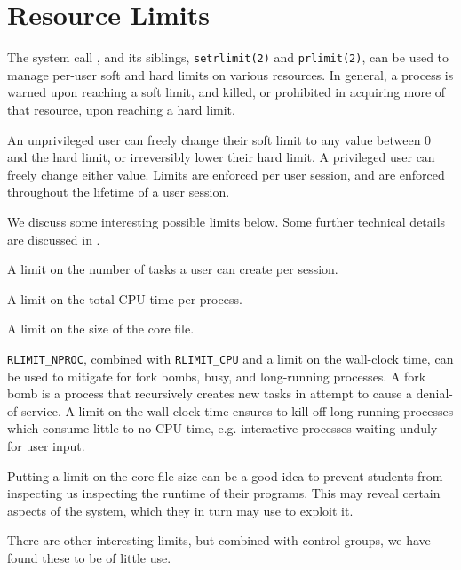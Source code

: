 
\section{Resource Limits}

\label{section:sandboxing:resource-limits}

The system call \cite{man-2-getrlimit}, and its siblings, \texttt{setrlimit(2)}
and \texttt{prlimit(2)}, can be used to manage per-user soft and hard limits on
various resources. In general, a process is warned upon reaching a soft limit,
and killed, or prohibited in acquiring more of that resource, upon reaching a
hard limit.

An unprivileged user can freely change their soft limit to any value between 0
and the hard limit, or irreversibly lower their hard limit. A privileged user
can freely change either value. Limits are enforced per user session, and are
enforced throughout the lifetime of a user session.

We discuss some interesting
possible limits below. Some further technical details are discussed in
.

\begin{description}[\setleftmargin{0.2in}\breaklabel\setlabelstyle{\tt}]

\item[RLIMIT\_NPROC] A limit on the number of tasks a user can create per session.

\item[RLIMIT\_CPU] A limit on the total CPU time per process.

\item[RLIMIT\_CORE] A limit on the size of the core file.

\end{description}

\texttt{RLIMIT\_NPROC}, combined with \texttt{RLIMIT\_CPU} and a limit on the
wall-clock time, can be used to mitigate for fork bombs, busy, and long-running
processes. A fork bomb is a process that recursively creates new tasks in
attempt to cause a denial-of-service. A limit on the wall-clock time ensures to
kill off long-running processes which consume little to no CPU time, e.g.
interactive processes waiting unduly for user input.

Putting a limit on the core file size can be a good idea to prevent students
from inspecting us inspecting the runtime of their programs. This may reveal
certain aspects of the system, which they in turn may use to exploit it.

There are other interesting limits, but combined with control groups, we have
found these to be of little use.
